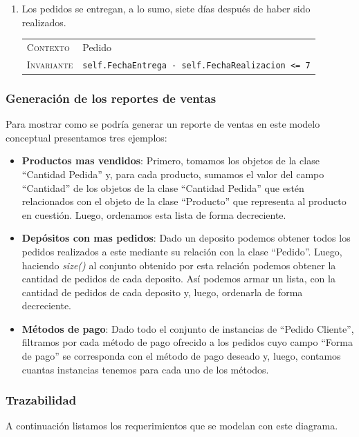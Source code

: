 \begin{enumerate}
    \item Los pedidos se entregan, a lo sumo, siete días después de haber sido realizados.
    
    \begin{center}
    \begin{tabular}{p{} p{}}
        \textsc{Contexto} & Pedido \\
        \textsc{Invariante} & \texttt{self.FechaEntrega - self.FechaRealizacion <= 7} \\
    \end{tabular}
    \end{center}

\end{enumerate}

\subsubsection{Generación de los reportes de ventas}

Para mostrar como se podría generar un reporte de ventas en este modelo conceptual presentamos tres ejemplos:

\begin{itemize}
\item \textbf{Productos mas vendidos}: Primero, tomamos los objetos de la clase ``Cantidad Pedida'' y, para cada producto, sumamos el valor del campo ``Cantidad'' de los objetos de la clase ``Cantidad Pedida'' que estén relacionados con el objeto de la clase ``Producto'' que representa al producto en cuestión. Luego, ordenamos esta lista de forma decreciente.
\item \textbf{Depósitos con mas pedidos}: Dado un deposito podemos obtener todos los pedidos realizados a este mediante su relación con la clase ``Pedido''. Luego, haciendo \textit{size()} al conjunto obtenido por esta relación podemos obtener la cantidad de pedidos de cada deposito. Así podemos armar un lista, con la cantidad de pedidos de cada deposito y, luego, ordenarla de forma decreciente.
\item \textbf{Métodos de pago}: Dado todo el conjunto de instancias de ``Pedido Cliente'', filtramos por cada método de pago ofrecido a los pedidos cuyo campo ``Forma de pago'' se corresponda con el método de pago deseado y, luego, contamos cuantas instancias tenemos para cada uno de los métodos.
\end{itemize}

\subsubsection{Trazabilidad}
A continuación listamos los requerimientos que se modelan con este diagrama.

